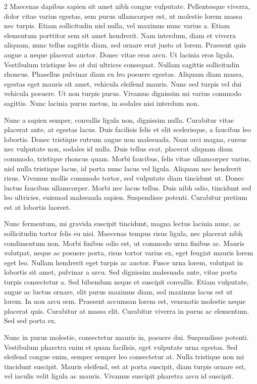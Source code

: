 \documentclass[9pt,]{book}
\begin{document}
\begin {multicols}{2}
Maecenas dapibus sapien sit amet nibh congue vulputate. Pellentesque
viverra, dolor vitae varius egestas, sem purus ullamcorper est, ut
molestie lorem massa nec turpis. Etiam sollicitudin nisl nulla, vel
maximus nunc varius a. Etiam elementum porttitor sem sit amet hendrerit.
Nam interdum, diam et viverra aliquam, nunc tellus sagittis diam, sed
ornare erat justo at lorem. Praesent quis augue a neque placerat auctor.
Donec vitae eros arcu. Ut lacinia eros ligula. Vestibulum tristique leo
at dui ultrices consequat. Nullam sagittis sollicitudin rhoncus.
Phasellus pulvinar diam eu leo posuere egestas. Aliquam diam massa,
egestas eget mauris sit amet, vehicula eleifend mauris. Nunc sed turpis
vel dui vehicula posuere. Ut non turpis purus. Vivamus dignissim mi
varius commodo sagittis. Nunc lacinia purus metus, in sodales nisi
interdum non.

Nunc a sapien semper, convallis ligula non, dignissim nulla. Curabitur
vitae placerat ante, at egestas lacus. Duis facilisis felis et elit
scelerisque, a faucibus leo lobortis. Donec tristique rutrum augue non
malesuada. Nam orci magna, cursus nec vulputate non, sodales id nulla.
Duis tellus erat, placerat aliquam diam commodo, tristique rhoncus quam.
Morbi faucibus, felis vitae ullamcorper varius, nisl nulla tristique
lacus, id porta nunc lacus vel ligula. Aliquam nec hendrerit risus.
Vivamus mollis commodo tortor, sed vulputate diam tincidunt ut. Donec
luctus faucibus ullamcorper. Morbi nec lacus tellus. Duis nibh odio,
tincidunt sed leo ultricies, euismod malesuada sapien. Suspendisse
potenti. Curabitur pretium est at lobortis laoreet.

Nunc fermentum, mi gravida suscipit tincidunt, magna lectus lacinia
nunc, ac sollicitudin tortor felis eu nisi. Maecenas tempus risus
ligula, nec placerat nibh condimentum non. Morbi finibus odio est, ut
commodo urna finibus ac. Mauris volutpat, neque ac posuere porta, risus
tortor varius ex, eget feugiat mauris lorem eget leo. Nullam hendrerit
eget turpis ac auctor. Fusce urna lorem, volutpat in lobortis sit amet,
pulvinar a arcu. Sed dignissim malesuada ante, vitae porta turpis
consectetur a. Sed bibendum neque et suscipit convallis. Etiam
vulputate, augue ac luctus ornare, elit purus maximus diam, sed maximus
lacus est ut lorem. In non arcu sem. Praesent accumsan lorem est,
venenatis molestie neque placerat quis. Curabitur at massa elit.
Curabitur viverra in purus ac elementum. Sed sed porta ex.

Nunc in purus molestie, consectetur mauris in, posuere dui. Suspendisse
potenti. Vestibulum pharetra enim et quam facilisis, eget vulputate urna
egestas. Sed eleifend congue enim, semper semper leo consectetur at.
Nulla tristique non mi tincidunt suscipit. Mauris eleifend, est at porta
suscipit, diam turpis ornare est, vel iaculis velit ligula ac mauris.
Vivamus suscipit pharetra arcu id suscipit.

\end {multicols}

\end{document}
